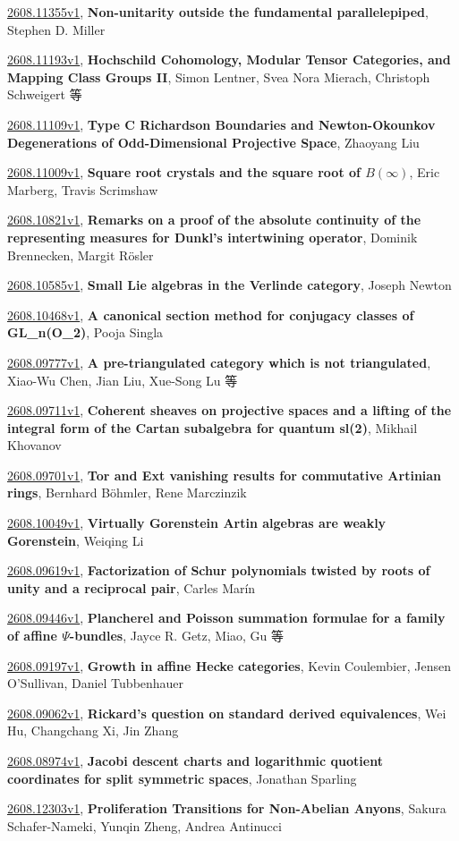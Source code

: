 \documentclass[9pt, a4paper]{article}
\theoremstyle{plain}
\theoremstyle{definition}
\theoremstyle{remark}
\newcommand{\arxiv}[3]{\href{https://arxiv.org/abs/#1}{#1}, \textbf{\textcolor{arxivblue}{#2}}, #3}
\begin{document}
\arxiv{2608.11355v1}{Non-unitarity outside the fundamental parallelepiped}{Stephen D. Miller}

\arxiv{2608.11193v1}{Hochschild Cohomology, Modular Tensor Categories, and Mapping Class Groups II}{Simon Lentner, Svea Nora Mierach, Christoph Schweigert 等}

\arxiv{2608.11109v1}{Type C Richardson Boundaries and Newton-Okounkov Degenerations of Odd-Dimensional Projective Space}{Zhaoyang Liu}

\arxiv{2608.11009v1}{Square root crystals and the square root of $B(\infty)$}{Eric Marberg, Travis Scrimshaw}

\arxiv{2608.10821v1}{Remarks on a proof of the absolute continuity of the representing measures for Dunkl's intertwining operator}{Dominik Brennecken, Margit Rösler}

\arxiv{2608.10585v1}{Small Lie algebras in the Verlinde category}{Joseph Newton}

\arxiv{2608.10468v1}{A canonical section method for conjugacy classes of GL_n(O_2)}{Pooja Singla}

\arxiv{2608.09777v1}{A pre-triangulated category which is not triangulated}{Xiao-Wu Chen, Jian Liu, Xue-Song Lu 等}

\arxiv{2608.09711v1}{Coherent sheaves on projective spaces and a lifting of the integral form of the Cartan subalgebra for quantum sl(2)}{Mikhail Khovanov}

\arxiv{2608.09701v1}{Tor and Ext vanishing results for commutative Artinian rings}{Bernhard Böhmler, Rene Marczinzik}

\arxiv{2608.10049v1}{Virtually Gorenstein Artin algebras are weakly Gorenstein}{Weiqing Li}

\arxiv{2608.09619v1}{Factorization of Schur polynomials twisted by roots of unity and a reciprocal pair}{Carles Marín}

\arxiv{2608.09446v1}{Plancherel and Poisson summation formulae for a family of affine $Ψ$-bundles}{Jayce R. Getz,  Miao,  Gu 等}

\arxiv{2608.09197v1}{Growth in affine Hecke categories}{Kevin Coulembier, Jensen O'Sullivan, Daniel Tubbenhauer}

\arxiv{2608.09062v1}{Rickard's question on standard derived equivalences}{Wei Hu, Changchang Xi, Jin Zhang}

\arxiv{2608.08974v1}{Jacobi descent charts and logarithmic quotient coordinates for split symmetric spaces}{Jonathan Sparling}

\arxiv{2608.12303v1}{Proliferation Transitions for Non-Abelian Anyons}{Sakura Schafer-Nameki, Yunqin Zheng, Andrea Antinucci}
\end{document}
